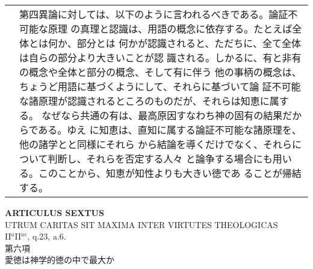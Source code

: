 \documentclass[10pt]{jsarticle}
\begin{document}
\begin{longtable}{p{21em}p{21em}}
&

 第四異論に対しては、以下のように言われるべきである。論証不可能な原理
 の真理と認識は、用語の概念に依存する。たとえば全体とは何か、部分とは
 何かが認識されると、ただちに、全て全体は自らの部分より大きいことが認
 識される。しかるに、有と非有の概念や全体と部分の概念、そして有に伴う
 他の事柄の概念は、ちょうど用語に基づくようにして、それらに基づいて論
 証不可能な諸原理が認識されるところのものだが、それらは知恵に属する。
 なぜなら共通の有は、最高原因すなわち神の固有の結果だからである。ゆえ
 に知恵は、直知に属する論証不可能な諸原理を、他の諸学とと同様にそれら
 から結論を導くだけでなく、それらについて判断し、それらを否定する人々
 と論争する場合にも用いる。このことから、知恵が知性よりも大きい徳であ
 ることが帰結する。




\end{longtable}
\newpage





\begin{center}
{\Large {\bf ARTICULUS SEXTUS}}\\
{\large UTRUM CARITAS SIT MAXIMA INTER VIRTUTES THEOLOGICAS}\\
{\footnotesize II$^{a}$II$^{ae}$, q.23, a.6.}\\
{\Large 第六項\\愛徳は神学的徳の中で最大か}
\end{center}
\end{document}
